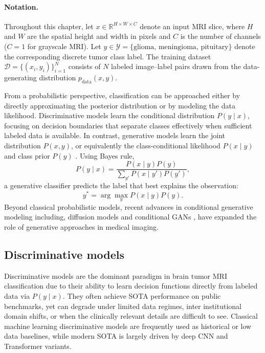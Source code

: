 \paragraph{Notation.}
Throughout this chapter, let $x \in \mathbb{R}^{H \times W \times C}$ denote an input MRI slice, where $H$ and $W$ are the spatial height and width in pixels and $C$ is the number of channels ($C=1$ for grayscale MRI). Let $y \in \mathcal{Y} = \{\text{glioma},\, \text{meningioma},\, \text{pituitary}\}$ denote the corresponding discrete tumor class label. The training dataset $\mathcal{D} = \{(x_i, y_i)\}_{i=1}^{N}$ consists of $N$ labeled image--label pairs drawn from the data-generating distribution $p_{\text{data}}(x, y)$.

From a probabilistic perspective, classification can be approached either by directly approximating the posterior distribution or by modeling the data likelihood. Discriminative models learn the conditional distribution $P(y\mid x)$, focusing on decision boundaries that separate classes effectively when sufficient labeled data is available. In contrast, generative models learn the joint distribution $P(x,y)$, or equivalently the class-conditional likelihood $P(x\mid y)$ and class prior $P(y)$ \citep{mackowiak2021generative}. Using Bayes rule,
\begin{equation}
P(y\mid x) = \frac{P(x\mid y)P(y)}{\sum_{y'} P(x\mid y')P(y')},
\end{equation}
a generative classifier predicts the label that best explains the observation:
\begin{equation}
y^* = \arg\max_y P(x\mid y)P(y).
\end{equation}
Beyond classical probabilistic models, recent advances in conditional generative modeling including, diffusion models \cite{ukita2025imageclassificationusingdiffusion} and conditional GANs \cite{mirza2014conditionalgenerativeadversarialnets}, have expanded the role of generative approaches in medical imaging.

\subsection{Discriminative models}

Discriminative models are the dominant paradigm in brain tumor MRI classification due to their ability to learn decision functions directly from labeled data via $P(y\mid x)$. They often achieve SOTA performance on public benchmarks, yet can degrade under limited data regimes, inter institutional domain shifts, or when the clinically relevant details are difficult to see. Classical machine learning discriminative models are frequently used as historical or low data baselines, while modern SOTA is largely driven by deep CNN and Transformer variants. 

